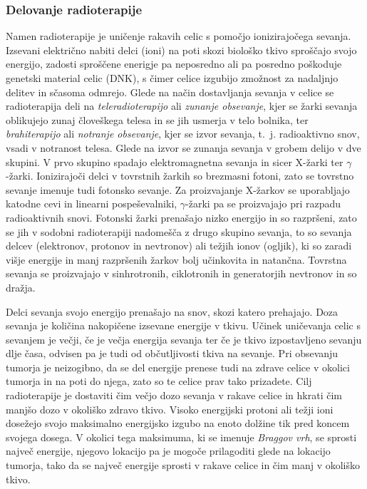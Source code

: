 \documentclass[a4paper,twoside,11pt]{article}
\begin{document}
	\subsubsection*{Delovanje radioterapije}
	\par{
	  Namen radioterapije je uničenje rakavih celic s pomočjo ionizirajočega sevanja. Izsevani električno nabiti delci (ioni) na poti skozi biološko tkivo sproščajo svojo energijo, zadosti sproščene enerigje pa neposredno ali pa posredno poškoduje genetski material celic (DNK), s čimer celice izgubijo zmožnost za nadaljnjo delitev in sčasoma odmrejo. Glede na način dostavljanja sevanja v celice se radioterapija deli na \emph{teleradioterapijo} ali \emph{zunanje obsevanje}, kjer se žarki sevanja oblikujejo zunaj človeškega telesa in se jih usmerja v telo bolnika, ter \emph{brahiterapijo} ali \emph{notranje obsevanje}, kjer se izvor sevanja, t.~j. radioaktivno snov, vsadi v notranost telesa. Glede na izvor se zunanja sevanja v grobem delijo v dve skupini. V prvo skupino spadajo elektromagnetna sevanja in sicer X-žarki ter $\gamma$-žarki. Ionizirajoči delci v tovrstnih žarkih so brezmasni fotoni, zato se tovrstno sevanje imenuje tudi fotonsko sevanje. Za proizvajanje X-žarkov se uporabljajo katodne cevi in linearni pospeševalniki, $\gamma$-žarki pa se proizvajajo pri razpadu radioaktivnih snovi. Fotonski žarki prenašajo nizko energijo in so razpršeni, zato se jih v sodobni radioterapiji nadomešča z drugo skupino sevanja, to so sevanja delcev (elektronov, protonov in nevtronov) ali težjih ionov (ogljik), ki so zaradi višje energije in manj razpršenih žarkov bolj učinkovita in natančna. Tovrstna sevanja se proizvajajo v sinhrotronih, ciklotronih in generatorjih nevtronov in so dražja. \cite{baskar2012}
	}
	\par{
	  Delci sevanja svojo energijo prenašajo na snov, skozi katero prehajajo. Doza sevanja je količina nakopičene izsevane energije v tkivu. Učinek uničevanja celic s sevanjem je večji, če je večja energija sevanja ter če je tkivo izpostavljeno sevanju dlje časa, odvisen pa je tudi od občutljivosti tkiva na sevanje. Pri obsevanju tumorja je neizogibno, da se del energije prenese tudi na zdrave celice v okolici tumorja in na poti do njega, zato so te celice prav tako prizadete. Cilj radioterapije je dostaviti čim večjo dozo sevanja v rakave celice in hkrati čim manjšo dozo v okoliško zdravo tkivo. Visoko energijski protoni ali težji ioni dosežejo svojo maksimalno energijsko izgubo na enoto dolžine tik pred koncem svojega dosega. V okolici tega maksimuma, ki se imenuje \emph{Braggov vrh}, se sprosti največ energije, njegovo lokacijo pa je mogoče prilagoditi glede na lokacijo tumorja, tako da se največ energije sprosti v rakave celice in čim manj v okoliško tkivo.
	}
\end{document}
